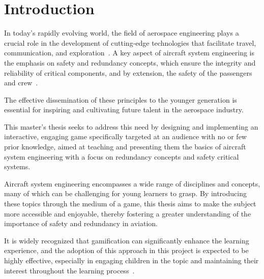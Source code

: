 
\chapter{Introduction}\label{ch:introduction}
In today's rapidly evolving world, the field of aerospace engineering plays a crucial role in the development of
cutting-edge technologies that facilitate travel, communication, and exploration~\cite{aircraft-dev}.
A key aspect of aircraft system engineering is the emphasis on safety and redundancy concepts,
which ensure the integrity and reliability of critical components, and by extension, the safety of the passengers and
crew~\cite{safety-criticality}.

The effective dissemination of these principles to the younger generation is essential for inspiring and cultivating future
talent in the aerospace industry.

This master's thesis seeks to address this need by designing and implementing an interactive,
engaging game specifically targeted at an audience with no or few prior knowledge,
aimed at teaching and presenting them the basics of aircraft system engineering with a focus on
redundancy concepts and safety critical systems.

Aircraft system engineering encompasses a wide range of disciplines and concepts, many of which can be challenging for young learners to grasp.
By introducing these topics through the medium of a game,
this thesis aims to make the subject more accessible and enjoyable,
thereby fostering a greater understanding of the importance of safety and redundancy in aviation.

It is widely recognized that gamification can significantly enhance the learning experience,
and the adoption of this approach in this project is expected to be highly effective,
especially in engaging children in the topic and maintaining their interest throughout the learning
process~\cite{application-of-education-games-to-enhance-student-learning}.

